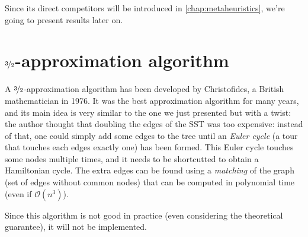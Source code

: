 Since its direct competitors will be introduced in
\autoref{chap:metaheuristics}, we're going to present results later on.

\section{$\nicefrac{3}{2}$-approximation algorithm}
A $\nicefrac{3}{2}$-approximation algorithm has been developed by Christofides,
a British mathematician in 1976. It was the best approximation algorithm for
many years, and its main idea is very similar to the one we just presented but
with a twist: the author thought that doubling the edges of the SST was too
expensive: instead of that, one could simply add some edges to the tree until an
\emph{Euler cycle} (a tour that touches each edges exactly one) has been formed.
This Euler cycle touches some nodes multiple times, and it needs to be
shortcutted to obtain a Hamiltonian cycle. The extra edges can be found
using a \emph{matching} of the graph (set of edges without common nodes) that
can be computed in polynomial time (even if $\mathcal{O}(n^3)$).

Since this algorithm is not good in practice (even considering the
theoretical guarantee), it will not be implemented.
